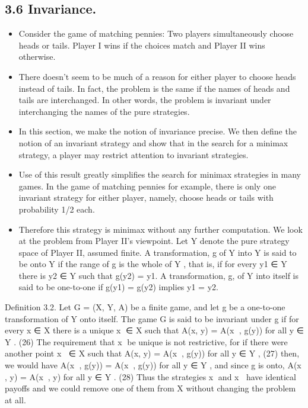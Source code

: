 \documentclass[]{report}
\begin{document}
\subsection{3.6 Invariance.} 
\begin{itemize}
\item Consider the game of matching pennies: Two players simultaneously
choose heads or tails. Player I wins if the choices match and Player II wins otherwise.
\item There doesn’t seem to be much of a reason for either player to choose heads instead of
tails. In fact, the problem is the same if the names of heads and tails are interchanged. In
other words, the problem is invariant under interchanging the names of the pure strategies.
\item 
In this section, we make the notion of invariance precise. We then define the notion of
an invariant strategy and show that in the search for a minimax strategy, a player may
restrict attention to invariant strategies. 
\item Use of this result greatly simplifies the search for
minimax strategies in many games. In the game of matching pennies for example, there is
only one invariant strategy for either player, namely, choose heads or tails with probability
1/2 each. 
\item 
Therefore this strategy is minimax without any further computation.
We look at the problem from Player II’s viewpoint. Let Y denote the pure strategy
space of Player II, assumed finite. A transformation, g of Y into Y is said to be onto Y
if the range of g is the whole of Y , that is, if for every y1 ∈ Y there is y2 ∈ Y such that
g(y2) = y1. A transformation, g, of Y into itself is said to be one-to-one if g(y1) = g(y2)
implies y1 = y2.
\end{itemize}
Definition 3.2. Let G = (X, Y, A) be a finite game, and let g be a one-to-one transformation
of Y onto itself. The game G is said to be invariant under g if for every x ∈ X
there is a unique x ∈ X such that
A(x, y) = A(x
, g(y)) for all y ∈ Y . (26)
The requirement that x be unique is not restrictive, for if there were another point
x ∈ X such that
A(x, y) = A(x, g(y)) for all y ∈ Y , (27)
then, we would have A(x
, g(y)) = A(x, g(y)) for all y ∈ Y , and since g is onto,
A(x
, y) = A(x, y) for all y ∈ Y . (28)
Thus the strategies x and x have identical payoffs and we could remove one of them from
X without changing the problem at all.
\end{document}
